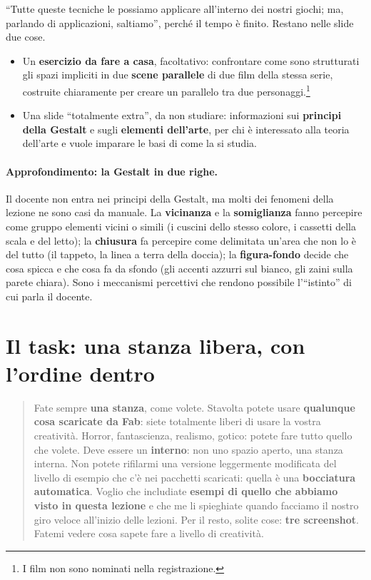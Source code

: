 ``Tutte queste tecniche le possiamo applicare all'interno dei nostri giochi; ma, parlando
di applicazioni, saltiamo'', perché il tempo è finito. Restano nelle slide due cose.
\begin{itemize}
  \item Un \textbf{esercizio da fare a casa}, facoltativo: confrontare come sono
        strutturati gli spazi impliciti in due \textbf{scene parallele} di due film della
        stessa serie, costruite chiaramente per creare un parallelo tra due
        personaggi.\footnote{I film non sono nominati nella registrazione.}
  \item Una slide ``totalmente extra'', da non studiare: informazioni sui
        \textbf{principi della Gestalt} e sugli \textbf{elementi dell'arte}, per chi è
        interessato alla teoria dell'arte e vuole imparare le basi di come la si studia.
\end{itemize}

\paragraph{Approfondimento: la Gestalt in due righe.} Il docente non entra nei principi
della Gestalt, ma molti dei fenomeni della lezione ne sono casi da manuale. La
\textbf{vicinanza} e la \textbf{somiglianza} fanno percepire come gruppo elementi vicini o
simili (i cuscini dello stesso colore, i cassetti della scala e del letto); la
\textbf{chiusura} fa percepire come delimitata un'area che non lo è del tutto (il tappeto,
la linea a terra della doccia); la \textbf{figura-fondo} decide che cosa spicca e che cosa
fa da sfondo (gli accenti azzurri sul bianco, gli zaini sulla parete chiara). Sono i
meccanismi percettivi che rendono possibile l'``istinto'' di cui parla il docente.

\section{Il task: una stanza libera, con l'ordine dentro}
\label{gd17:sec:task}

\begin{quote}
Fate sempre \textbf{una stanza}, come volete. Stavolta potete usare \textbf{qualunque cosa
scaricate da Fab}: siete totalmente liberi di usare la vostra creatività. Horror,
fantascienza, realismo, gotico: potete fare tutto quello che volete. Deve essere un
\textbf{interno}: non uno spazio aperto, una stanza interna. Non potete rifilarmi una
versione leggermente modificata del livello di esempio che c'è nei pacchetti scaricati:
quella è una \textbf{bocciatura automatica}. Voglio che includiate \textbf{esempi di
quello che abbiamo visto in questa lezione} e che me li spieghiate quando facciamo il
nostro giro veloce all'inizio delle lezioni. Per il resto, solite cose: \textbf{tre
screenshot}. Fatemi vedere cosa sapete fare a livello di creatività.
\end{quote}

